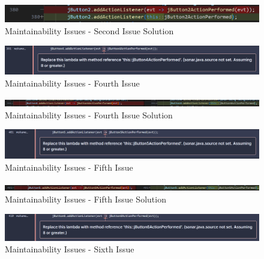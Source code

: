 \documentclass[12pt,a4paper]{article}
\begin{document}
\begin{figure}[H]
    \centering
    \includegraphics[width=1\textwidth]{AbdouPhotos/Maintainability/jButton2Solution.png}
    \caption{Maintainability Issues - Second Issue Solution}
    \label{fig:MI-2ndS}
\end{figure}
\begin{figure}[H]
    \centering
    \includegraphics[width=1\textwidth]{AbdouPhotos/Maintainability/jButton4.png}
    \caption{Maintainability Issues - Fourth Issue}
    \label{fig:MI-4th}
\end{figure}
\begin{figure}[H]
    \centering
    \includegraphics[width=1\textwidth]{AbdouPhotos/Maintainability/jButton4Solution.png}
    \caption{Maintainability Issues - Fourth Issue Solution}
    \label{fig:MI-4thS}
\end{figure}
\begin{figure}[H]
    \centering
    \includegraphics[width=1\textwidth]{AbdouPhotos/Maintainability/jButton5.png}
    \caption{Maintainability Issues - Fifth Issue}
    \label{fig:MI-5th}
\end{figure}
\begin{figure}[H]
    \centering
    \includegraphics[width=1\textwidth]{AbdouPhotos/Maintainability/jButton5Solution.png}
    \caption{Maintainability Issues - Fifth Issue Solution}
    \label{fig:MI-5thS}
\end{figure}
\begin{figure}[H]
    \centering
    \includegraphics[width=1\textwidth]{AbdouPhotos/Maintainability/jButton6.png}
    \caption{Maintainability Issues - Sixth Issue}
    \label{fig:MI-6th}
\end{figure}
\end{document}
